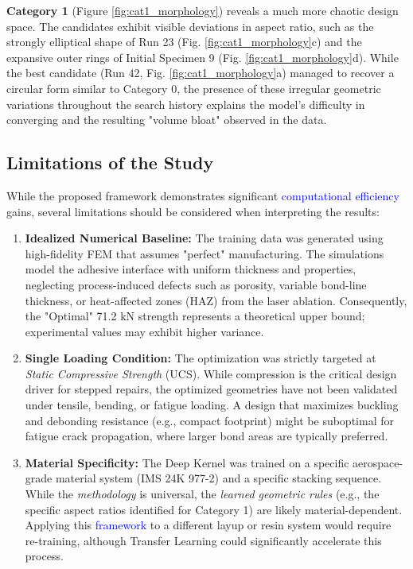 \documentclass[
  preprint,
  12pt,
  a4paper
]{elsarticle}
\newcommand{\new}[1]{\textcolor{blue}{#1}}
\begin{document}
\textbf{Category 1} (Figure \ref{fig:cat1_morphology}) reveals a much more chaotic design space. The candidates exhibit visible deviations in aspect ratio, such as the strongly elliptical shape of Run 23 (Fig. \ref{fig:cat1_morphology}c) and the expansive outer rings of Initial Specimen 9 (Fig. \ref{fig:cat1_morphology}d). While the best candidate (Run 42, Fig. \ref{fig:cat1_morphology}a) managed to recover a circular form similar to Category 0, the presence of these irregular geometric variations throughout the search history explains the model's difficulty in converging and the resulting "volume bloat" observed in the data.

\subsection{Limitations of the Study}
\label{sec:limitations}

While the proposed framework demonstrates significant \new{computational efficiency} gains, several limitations should be considered when interpreting the results:

\begin{enumerate}
    \item \textbf{Idealized Numerical Baseline:} The training data was generated using high-fidelity FEM that assumes "perfect" manufacturing. The simulations model the adhesive interface with uniform thickness and properties, neglecting process-induced defects such as porosity, variable bond-line thickness, or heat-affected zones (HAZ) from the laser ablation. Consequently, the "Optimal" 71.2 kN strength represents a theoretical upper bound; experimental values may exhibit higher variance.
    
    \item \textbf{Single Loading Condition:} The optimization was strictly targeted at \textit{Static Compressive Strength} (UCS). While compression is the critical design driver for stepped repairs, the optimized geometries have not been validated under tensile, bending, or fatigue loading. A design that maximizes buckling and debonding resistance (e.g., compact footprint) might be suboptimal for fatigue crack propagation, where larger bond areas are typically preferred.
    
    \item \textbf{Material Specificity:} The Deep Kernel was trained on a specific aerospace-grade material system (IMS 24K 977-2) and a specific stacking sequence. While the \textit{methodology} is universal, the \textit{learned geometric rules} (e.g., the specific aspect ratios identified for Category 1) are likely material-dependent. Applying this \new{framework} to a different layup or resin system would require re-training, although Transfer Learning could significantly accelerate this process.
\end{enumerate}
\end{document}

